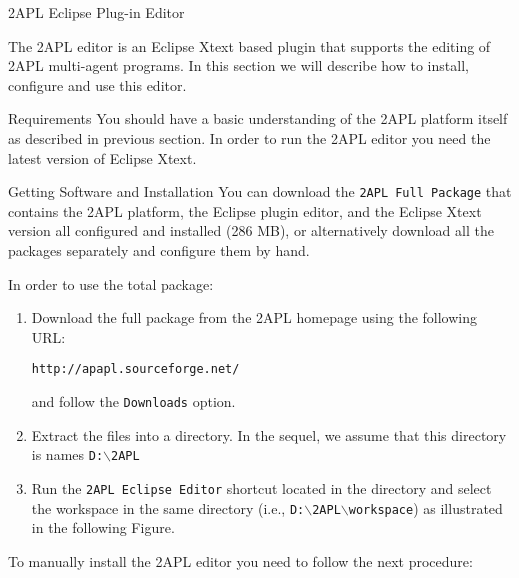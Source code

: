 \begin{section}{2APL Eclipse Plug-in Editor} \label{chap:eclipse}

The 2APL editor is an Eclipse Xtext based plugin that supports the
editing of 2APL multi-agent programs. In this section we will
describe how to install, configure and use this editor.

\begin{section}{Requirements}
You should have a basic understanding of the 2APL platform itself as
described in previous section. In order to run the 2APL editor you
need the latest version of Eclipse Xtext.
\end{section}

\begin{section}{Getting Software and Installation}
You can download the {\tt 2APL Full Package} that contains the 2APL
platform, the Eclipse plug\-in editor, and the Eclipse Xtext version
all configured and installed (286 MB), or alternatively download all
the packages separately and configure them by hand.

In order to use the total package:
\begin{enumerate}

    \item Download the full package from the 2APL homepage using the
    following URL:
    \begin{center}
    {\tt http://apapl.sourceforge.net/}
    \end{center}
    and follow the {\tt Downloads} option.

    \item Extract the files into a directory. In the sequel, we assume that this directory is names \texttt{D:$\backslash$2APL}

    \item Run the \texttt{2APL Eclipse Editor} shortcut located in the
    directory and select the workspace in the same directory (i.e.,
    \texttt{D:$\backslash$2APL$\backslash$workspace}) as illustrated in the following
    Figure.
        \begin{figure}[ht]
            \begin{center}
            \end{center}\label{fig:workspace}
        \end{figure}
\end{enumerate}

To manually install the 2APL editor you need to follow the next
procedure:


\end{section}
\end{section}
